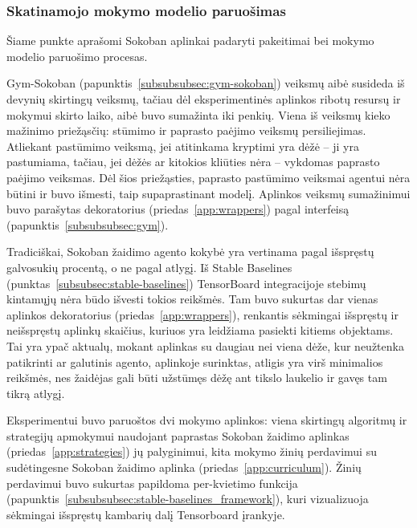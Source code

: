 \documentclass{VUMIFPSbakalaurinis}
\begin{document}
\subsubsection{Skatinamojo mokymo modelio paruošimas}
{
	Šiame punkte aprašomi Sokoban aplinkai padaryti pakeitimai bei mokymo modelio paruošimo procesas.
}
\label{subsubsubsec:sokoban_prepare}
{
	Gym-Sokoban (papunktis~\ref{subsubsubsec:gym-sokoban}) veiksmų aibė susideda iš devynių skirtingų veiksmų, tačiau dėl eksperimentinės aplinkos ribotų resursų ir mokymui skirto laiko, aibė buvo sumažinta iki penkių. Viena iš veiksmų kieko mažinimo priežąsčių: stūmimo ir paprasto paėjimo veiksmų persiliejimas. Atliekant pastūmimo veiksmą, jei atitinkama kryptimi yra dėžė -- ji yra pastumiama, tačiau, jei dėžės ar kitokios kliūties nėra -- vykdomas paprasto paėjimo veiksmas. Dėl šios priežąsties, paprasto pastūmimo veiksmai agentui nėra būtini ir buvo išmesti, taip supaprastinant modelį. Aplinkos veiksmų sumažinimui buvo parašytas dekoratorius (priedas~\ref{app:wrappers}) pagal  interfeisą (papunktis~\ref{subsubsubsec:gym}).\par
	
	Tradiciškai, Sokoban žaidimo agento kokybė yra vertinama pagal išspręstų galvosukių procentą, o ne pagal atlygį. Iš Stable Baselines (punktas~\ref{subsubsec:stable-baselines}) TensorBoard integracijoje stebimų kintamųjų nėra būdo išvesti tokios reikšmės. Tam buvo sukurtas dar vienas aplinkos dekoratorius (priedas~\ref{app:wrappers}), renkantis sėkmingai išspręstų ir neišspręstų aplinkų skaičius, kuriuos yra leidžiama pasiekti kitiems objektams. Tai yra ypač aktualų, mokant aplinkas su daugiau nei viena dėže, kur neužtenka patikrinti ar galutinis agento, aplinkoje surinktas, atligis yra virš minimalios reikšmės, nes žaidėjas gali būti užstūmęs dėžę ant tikslo laukelio ir gavęs tam tikrą atlygį. 
}
{
	Eksperimentui buvo paruoštos dvi mokymo aplinkos: viena skirtingų algoritmų ir strategijų apmokymui naudojant paprastas Sokoban žaidimo aplinkas (priedas~\ref{app:strategies}) jų palyginimui, kita mokymo žinių perdavimui su sudėtingesne Sokoban žaidimo aplinka (priedas~\ref{app:curriculum}). Žinių perdavimui buvo sukurtas papildoma per-kvietimo funkcija (papunktis~\ref{subsubsubsec:stable-baselines_framework}), kuri vizualizuoja sėkmingai išspręstų kambarių dalį Tensorboard įrankyje.\par
}
\end{document}
